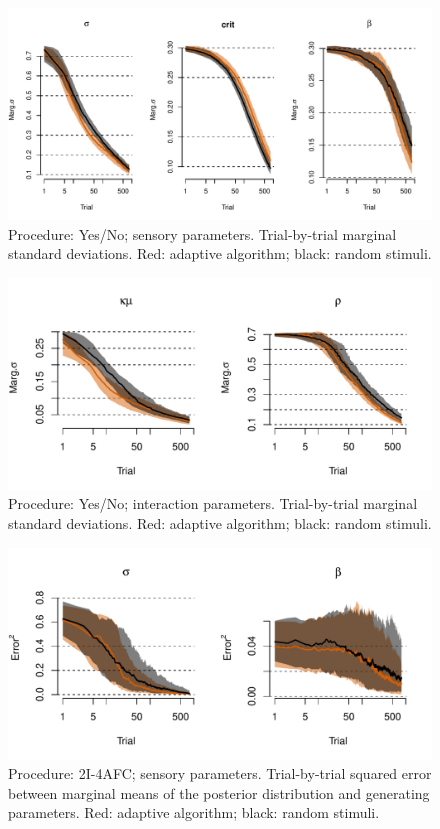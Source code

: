 \documentclass{article}\usepackage{knitr}
\begin{document}
\begin{figure}[H]
\centering
\includegraphics[scale=0.75, angle = 0]{simulation_YN_sensory_SD}
\caption{Procedure: Yes/No; sensory parameters. Trial-by-trial marginal standard deviations. Red: adaptive algorithm; black: random stimuli.}
\label{fig:simulation_YN_sensory_SD}
\end{figure}

\begin{figure}[H]
\centering
\includegraphics[scale=0.75, angle = 0]{simulation_YN_interaction_SD}
\caption{Procedure: Yes/No; interaction parameters. Trial-by-trial marginal standard deviations. Red: adaptive algorithm; black: random stimuli.}
\label{fig:simulation_YN_interaction_SD}
\end{figure}

\begin{figure}[H]
\centering
\includegraphics[scale=0.75, angle = 0]{simulation_AFC_sensory_sq_error}
\caption{Procedure: 2I-4AFC; sensory parameters. Trial-by-trial squared error between marginal means of the posterior distribution and generating parameters. Red: adaptive algorithm; black: random stimuli.}
\label{fig:simulation_AFC_sensory_sq_error}
\end{figure}
\end{document}
